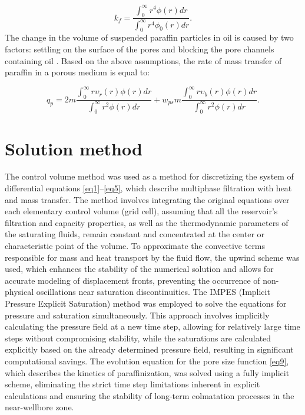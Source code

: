\documentclass[
11pt,%
tightenlines,%
twoside,%
onecolumn,%
nofloats,%
nobibnotes,%
nofootinbib,%
superscriptaddress,%
noshowpacs,%
centertags]%
{revtex4-2}
\begin{document}
\begin{equation}\label{eq11}
k_f = \frac
{ \int_{0}^{\infty} r^4 \phi (r) dr}
{ \int_{0}^{\infty} r^4 \phi_0 (r) dr}.
\end{equation}
The change in the volume of suspended paraffin particles in oil is caused by two factors: settling on the surface of the pores and blocking the pore channels containing oil \cite{4}. Based on the above assumptions, the rate of mass transfer of paraffin in a porous medium is equal to:

\begin{equation}\label{eq12}
q_p =
2 m \frac{ \int_{0}^{\infty} r \upsilon_r(r) \phi (r) dr}{ \int_{0}^{\infty} r^2 \phi(r) dr} + 
w_{ps} m  \frac{ \int_{0}^{\infty} r \upsilon_b(r) \phi (r) dr}{ \int_{0}^{\infty} r^2 \phi(r) dr}.
\end{equation}


\section{Solution method}
	The control volume method was used as a method for discretizing the system of differential equations \eqref{eq1}--\eqref{eq5}, which describe multiphase filtration with heat and mass transfer. The method involves integrating the original equations over each elementary control volume (grid cell), assuming that all the reservoir's filtration and capacity properties, as well as the thermodynamic parameters of the saturating fluids, remain constant and concentrated at the center or characteristic point of the volume. To approximate the convective terms responsible for mass and heat transport by the fluid flow, the upwind scheme was used, which enhances the stability of the numerical solution and allows for accurate modeling of displacement fronts, preventing the occurrence of non-physical oscillations near saturation discontinuities. The IMPES (Implicit Pressure Explicit Saturation) method was employed to solve the equations for pressure and saturation simultaneously. This approach involves implicitly calculating the pressure field at a new time step, allowing for relatively large time steps without compromising stability, while the saturations are calculated explicitly based on the already determined pressure field, resulting in significant computational savings. The evolution equation for the pore size function \eqref{eq9}, which describes the kinetics of paraffinization, was solved using a fully implicit scheme, eliminating the strict time step limitations inherent in explicit calculations and ensuring the stability of long-term colmatation processes in the near-wellbore zone.
\end{document}
